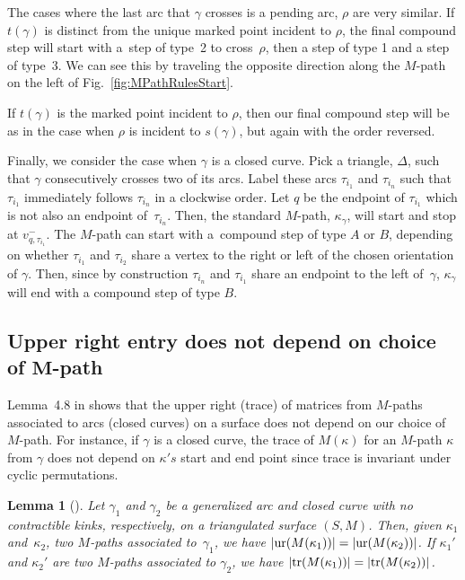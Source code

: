 \documentclass[pdftex]{sigma}%
\numberwithin{equation}{section}
\newtheorem{Lemma}[Theorem]{Lemma}
\begin{document}
The cases where the last arc that $\gamma$ crosses is a pending arc, $\rho$ are very similar. If $t(\gamma)$ is distinct from the unique marked point incident to $\rho$, the final compound step will start with a~step of type~2 to cross~$\rho$, then a step of type 1 and a step of type~3. We can see this by traveling the opposite direction along the $M$-path on the left of Fig.~\ref{fig:MPathRulesStart}.

If $t(\gamma)$ is the marked point incident to $\rho$, then our final compound step will be as in the case when $\rho$ is incident to $s(\gamma)$, but again with the order reversed.

Finally, we consider the case when $\gamma$ is a closed curve. Pick a triangle, $\Delta$, such that $\gamma$ consecutively crosses two of its arcs. Label these arcs $\tau_{i_1}$ and $\tau_{i_n}$ such that $\tau_{i_1}$ immediately follows $\tau_{i_n}$ in a clockwise order. Let $q$ be the endpoint of $\tau_{i_1}$ which is not also an endpoint of~$\tau_{i_n}$. Then, the standard $M$-path, $\kappa_\gamma$, will start and stop at $v_{q, \tau_{i_1}}^-$. The $M$-path can start with a~compound step of type $A$ or $B$, depending on whether $\tau_{i_1}$ and $\tau_{i_2}$ share a vertex to the right or left of the chosen orientation of $\gamma$. Then, since by construction $\tau_{i_n}$ and $\tau_{i_1}$ share an endpoint to the left of~$\gamma$, $\kappa_\gamma$ will end with a compound step of type $B$.

\subsection[Upper right entry does not depend on choice of $M$-path]{Upper right entry does not depend on choice of $\boldsymbol{M}$-path}

Lemma~4.8 in \cite{MW} shows that the upper right (trace) of matrices from $M$-paths associated to arcs (closed curves) on a surface does not depend on our choice of $M$-path. For instance, if $\gamma$ is a closed curve, the trace of $M(\kappa)$ for an $M$-path $\kappa$ from $\gamma$ does not depend on $\kappa's$ start and end point since trace is invariant under cyclic permutations.

\begin{Lemma}[{\cite[Lemma 4.8]{MW}}]\label{lem:MWMPathDontCare}
Let $\gamma_1$ and $\gamma_2$ be a generalized arc and closed curve with no contractible kinks, respectively, on a triangulated surface $(S,M)$. Then, given $\kappa_1$ and~$\kappa_2$, two $M$-paths associated to~$\gamma_1$, we have $\vert {\rm ur}(M(\kappa_1)) \vert = \vert {\rm ur}(M(\kappa_2))\vert $. If $\kappa_1'$ and $\kappa_2'$ are two $M$-paths associated to $\gamma_2$, we have $\vert {\rm tr}(M(\kappa_1)) \vert = \vert {\rm tr}(M(\kappa_2)) \vert$.
\end{Lemma}
\end{document}
